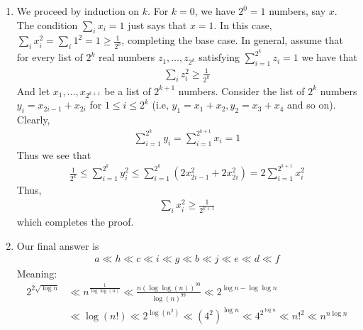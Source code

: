\documentclass[12pt]{article}
\theoremstyle{definitionstyle}
\begin{document}
\begin{enumerate}[leftmargin=\labelsep]
		\item We proceed by induction on $k$. For $k = 0$, we have $2^0 = 1$ numbers, say $x$. The condition $\sum_i x_i = 1$ just says that $x = 1$. In this case, $\sum_i x_i^2 = \sum_i 1^2 = 1 \geq \frac{1}{2^0}$, completing the base case. In general, assume that for every list of $2^k$ real numbers $z_1, \ldots, z_{2^k}$ satisfying $\sum_{i=1}^{2^k} z_i = 1$ we have that 
		\begin{align*}
			\sum_i z_i^2 \geq \frac{1}{2^k}
		\end{align*}
		And let $x_1, \ldots, x_{2^{k+1}}$ be a list of $2^{k+1}$ numbers. Consider the list of $2^k$ numbers $y_i = x_{2i-1} + x_{2i}$ for $1 \leq i \leq 2^k$ (i.e, $y_1 = x_1 + x_2, y_2 = x_3 + x_4$ and so on). Clearly,
		\begin{align*}
			\sum_{i=1}^{2^k} y_i = \sum_{i=1}^{2^{k+1}} x_i = 1
		\end{align*}
		Thus we see that
		\begin{align*}
			\frac{1}{2^k} \leq \sum_{i=1}^{2^k} y_i^2 \leq \sum_{i=1}^{2^k} (2x_{2i-1}^2 + 2x_{2i}^2) = 2\sum_{i=1}^{2^{k+1}} x_i^2
		\end{align*}
		Thus,
		\begin{align*}
			\sum_{i} x_i^2 \geq \frac{1}{2^{k+1}}
		\end{align*}
		which completes the proof.
		
		\item Our final answer is
		\begin{align*}
			a \ll h \ll c \ll i \ll g \ll b \ll j \ll e \ll d \ll f
		\end{align*}
		Meaning:
		\begin{align*}
			2^{2\sqrt{\log n}} &\ll n^{\frac{1}{\log\log(n)}} \ll \frac{n (\log\log(n))^{99}}{\log(n)^{99}} \ll 2^{\log n-\log \log n} 
			\\&\ll \log(n!) \ll 2^{\log(n^2)} \ll (4^2)^{\log n} \ll 4^{2^{\log n}} \ll n!^2 \ll n^{n \log n}
		\end{align*}
	\end{enumerate}
\end{document}

